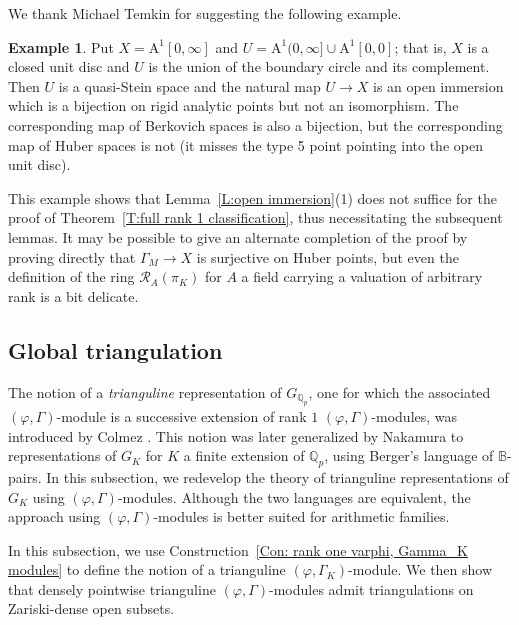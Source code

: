 \documentclass[12pt]{article}
\theoremstyle{definition}
\newtheorem{example}[theorem]{Example}
\numberwithin{equation}{theorem}
\newcommand{\calR}{\mathcal{R}}
\newcommand{\BB}{\mathbb{B}}
\newcommand{\QQ}{\mathbb{Q}}
\newcommand{\rmA}{\mathrm{A}}
\def\Qp{\QQ_p}
\begin{document}
We thank Michael Temkin for suggesting the following example.
\begin{example} \label{E:open immersion}
Put $X = \rmA^1[0,\infty]$ and $U = \rmA^1(0,\infty] \cup \rmA^1[0,0]$; that is, $X$ is a closed unit disc and $U$ is the union of the boundary circle and its complement. Then
$U$ is a quasi-Stein space and the natural map $U \to X$ is an open immersion which is a bijection on rigid analytic points but not an isomorphism. The corresponding map of Berkovich spaces is also a bijection, but the corresponding map of Huber spaces is not (it misses the type 5 point pointing into the open unit disc).

This example shows that Lemma~\ref{L:open immersion}(1) does not suffice for the proof of Theorem~\ref{T:full rank 1 classification},
thus necessitating the subsequent lemmas. It may be possible to give an alternate completion of the proof by proving directly that $\Gamma_M \to X$ is surjective on Huber points, but even the definition of the ring $\calR_A(\pi_K)$ for $A$ a field carrying a valuation of arbitrary rank is a bit delicate.
\end{example}


\subsection{Global triangulation}


The notion of a \emph{trianguline} representation of $G_{\Qp}$, one for which the associated $(\varphi, \Gamma)$-module is a successive extension of rank $1$ $(\varphi, \Gamma)$-modules, was introduced by Colmez \cite{colmez}.
This notion was later generalized by Nakamura \cite{nakamura} to representations of $G_K$ for $K$ a finite extension of $\Qp$, using Berger's language of $\BB$-pairs.
In this subsection, we redevelop the theory of trianguline representations of $G_K$ using $(\varphi, \Gamma)$-modules.  Although the two languages are equivalent, the approach using $(\varphi, \Gamma)$-modules is better suited for arithmetic families.


In this subsection, we use Construction~\ref{Con: rank one varphi, Gamma_K modules} to define the notion of a trianguline $(\varphi, \Gamma_K)$-module.
We then show that densely pointwise trianguline
$(\varphi,\Gamma)$-modules admit triangulations on Zariski-dense open
subsets.
\end{document}
